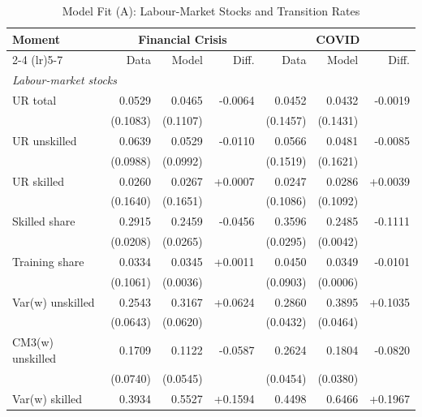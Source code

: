 \begin{table}[htbp]
  \centering
  \caption{Model Fit (A): Labour-Market Stocks and Transition Rates}
  \label{tab:model_fit_a}
  \small
  \begin{tabular}{lrrrrrr}
    \toprule
    Moment & \multicolumn{3}{c}{Financial Crisis} & \multicolumn{3}{c}{COVID} \\
    \cmidrule(lr){2-4} \cmidrule(lr){5-7}
     & Data & Model & Diff. & Data & Model & Diff. \\
    \midrule
    \multicolumn{7}{l}{\textit{Labour-market stocks}} \\[2pt]
    \quad UR total & 0.0529 & 0.0465 & -0.0064 & 0.0452 & 0.0432 & -0.0019 \\
     & {\scriptsize (0.1083)} & {\scriptsize (0.1107)} & & {\scriptsize (0.1457)} & {\scriptsize (0.1431)} & \\
    \quad UR unskilled & 0.0639 & 0.0529 & -0.0110 & 0.0566 & 0.0481 & -0.0085 \\
     & {\scriptsize (0.0988)} & {\scriptsize (0.0992)} & & {\scriptsize (0.1519)} & {\scriptsize (0.1621)} & \\
    \quad UR skilled & 0.0260 & 0.0267 & +0.0007 & 0.0247 & 0.0286 & +0.0039 \\
     & {\scriptsize (0.1640)} & {\scriptsize (0.1651)} & & {\scriptsize (0.1086)} & {\scriptsize (0.1092)} & \\
    \quad Skilled share & 0.2915 & 0.2459 & -0.0456 & 0.3596 & 0.2485 & -0.1111 \\
     & {\scriptsize (0.0208)} & {\scriptsize (0.0265)} & & {\scriptsize (0.0295)} & {\scriptsize (0.0042)} & \\
    \quad Training share & 0.0334 & 0.0345 & +0.0011 & 0.0450 & 0.0349 & -0.0101 \\
     & {\scriptsize (0.1061)} & {\scriptsize (0.0036)} & & {\scriptsize (0.0903)} & {\scriptsize (0.0006)} & \\
    \quad Var(w) unskilled & 0.2543 & 0.3167 & +0.0624 & 0.2860 & 0.3895 & +0.1035 \\
     & {\scriptsize (0.0643)} & {\scriptsize (0.0620)} & & {\scriptsize (0.0432)} & {\scriptsize (0.0464)} & \\
    \quad CM3(w) unskilled & 0.1709 & 0.1122 & -0.0587 & 0.2624 & 0.1804 & -0.0820 \\
     & {\scriptsize (0.0740)} & {\scriptsize (0.0545)} & & {\scriptsize (0.0454)} & {\scriptsize (0.0380)} & \\
    \quad Var(w) skilled & 0.3934 & 0.5527 & +0.1594 & 0.4498 & 0.6466 & +0.1967 \\

\end{tabular}
\end{table}
